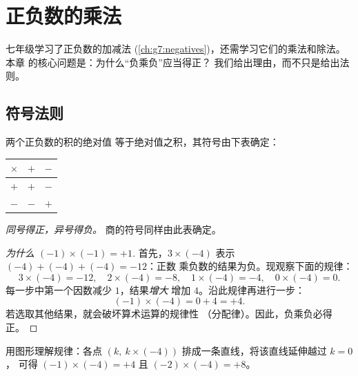 \chapter{正负数的乘法}\label{ch:g8:negprod}

七年级学习了正负数的加减法
(\cref{ch:g7:negatives})，还需学习它们的乘法和除法。本章
的核心问题是：为什么“负乘负”应当得正？
我们给出理由，而不只是给出法则。

\section{符号法则}

\begin{theorem}[积的符号]\label{thm:g8:negprod:rules}
两个正负数的积的绝对值
等于绝对值之积，其符号由下表确定：
\begin{center}
\renewcommand{\arraystretch}{1.3}
\begin{tabular}{c|cc}
$\times$ & $+$ & $-$ \\
\hline
$+$ & $+$ & $-$ \\
$-$ & $-$ & $+$ \\
\end{tabular}
\end{center}
\emph{同号得正，异号得负。}
商的符号同样由此表确定。
\end{theorem}

\begin{proof}[为什么 $(-1) \times (-1) = +1$]
首先，$3 \times (-4)$ 表示 $(-4) + (-4) + (-4) = -12$：正数
乘负数的结果为负。现观察下面的规律：
\[
3 \times (-4) = -12, \quad
2 \times (-4) = -8, \quad
1 \times (-4) = -4, \quad
0 \times (-4) = 0 .
\]
每一步中第一个因数减少 $1$，结果\emph{增大}
增加 $4$。沿此规律再进行一步：
\[
(-1) \times (-4) = 0 + 4 = +4 .
\]
若选取其他结果，就会破坏算术运算的规律性
（分配律）。因此，负乘负必得正。
\end{proof}

\begin{omfigure}

{\small 用图形理解规律：各点
$(k,\ k \times (-4))$ 排成一条直线，将该直线延伸越过 $k = 0$，
可得 $(-1)\times(-4) = +4$ 且 $(-2)\times(-4) = +8$。}
\end{omfigure}

